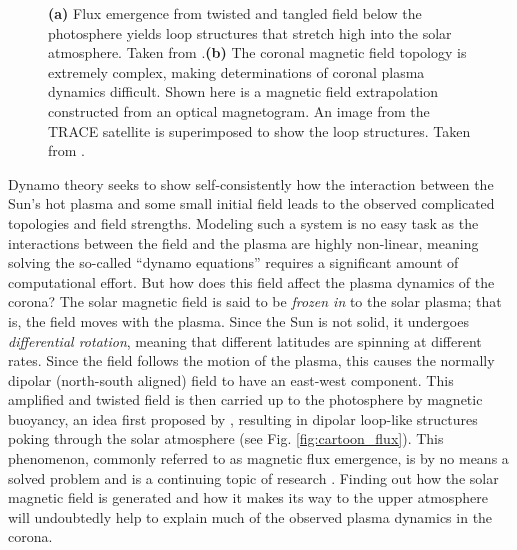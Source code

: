 \begin{figure}
	\centering
	\caption{\textbf{(a)} Flux emergence from twisted and tangled field below the photosphere yields loop structures that stretch high into the solar atmosphere. Taken from \citet{gold_magnetic_1964}.\textbf{(b)} The coronal magnetic field topology is extremely complex, making determinations of coronal plasma dynamics difficult. Shown here is a magnetic field extrapolation constructed from an optical magnetogram. An image from the TRACE satellite is superimposed to show the loop structures. Taken from \citet{reale_coronal_2010}.}
	\label{fig:complex_fields}
\end{figure}
%
\par Dynamo theory seeks to show self-consistently how the interaction between the Sun's hot plasma and some small initial field leads to the observed complicated topologies and field strengths. Modeling such a system is no easy task as the interactions between the field and the plasma are highly non-linear, meaning solving the so-called ``dynamo equations'' requires a significant amount of computational effort. But how does this field affect the plasma dynamics of the corona? The solar magnetic field is said to be \textit{frozen in} to the solar plasma; that is, the field moves with the plasma. Since the Sun is not solid, it undergoes \textit{differential rotation}, meaning that different latitudes are spinning at different rates. Since the field follows the motion of the plasma, this causes the normally dipolar (north-south aligned) field to have an east-west component. This amplified and twisted field is then carried up to the photosphere by magnetic buoyancy, an idea first proposed by \citep{parker_formation_1955}, resulting in dipolar loop-like structures poking through the solar atmosphere (see Fig. \ref{fig:cartoon_flux}). This phenomenon, commonly referred to as magnetic flux emergence, is by no means a solved problem and is a continuing topic of research \citep[see][]{cheung_flux_2014}. Finding out how the solar magnetic field is generated and how it makes its way to the upper atmosphere will undoubtedly help to explain much of the observed plasma dynamics in the corona.
